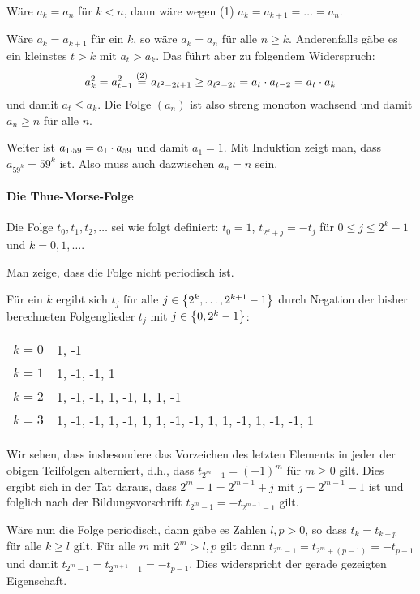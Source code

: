 \documentclass[11pt,a4paper]{article}
\begin{document}
\begin{loesung}
  Wäre $a_k=a_n$ für $k<n$, dann wäre wegen (1) $a_k=a_{k+1}=\dots=a_n$.

  Wäre $a_k=a_{k+1}$ für ein $k$, so wäre $a_k=a_n$ für alle $n\ge k$.
  Anderenfalls gäbe es ein kleinstes $t>k$ mit $a_t>a_k$. Das führt aber zu
  folgendem Widerspruch:
  \begin{gather*}
    a_k^2=a_{t-1}^2\stackrel{(2)}{=}a_{t^2-2t+1}\ge a_{t^2-2t}=a_t\cdot
    a_{t-2}=a_t\cdot a_k
  \end{gather*}
  und damit $a_t\le a_k$.  Die Folge $(a_n)$ ist also streng monoton
  wachsend und damit $a_n\ge n$ für alle $n$. 

  Weiter ist $a_{1\cdot 59}=a_1\cdot a_{59}$ und damit $a_1=1$. Mit Induktion zeigt
  man, dass $a_{59^k}=59^k$ ist. Also muss auch dazwischen $a_n=n$ sein.
\end{loesung}

\paragraph{Die Thue-Morse-Folge}
\begin{aufgabe}
  Die Folge $t_0,t_1,t_2,\dots$ sei wie folgt definiert: $t_0=1$,
  $t_{2^k+j}=-t_j$ für $0\le j\le 2^k-1$ und $k=0,1,\dots$.

  Man zeige, dass die Folge nicht periodisch ist.
\end{aufgabe}
\begin{loesung}
  Für ein $k$ ergibt sich $t_j$ für alle $j\in\left\{2^k,\dots,2^{k+1}-1\right\}$ durch
  Negation der bisher berechneten Folgenglieder $t_j$ mit $j\in\left\{0,2^k-1\right\}$:
  \begin{center}
    \begin{tabular}{c|l} 
      $k=0$ & 1, -1\\
      $k=1$ & 1, -1, -1, 1\\
      $k=2$ & 1, -1, -1, 1, -1, 1, 1, -1\\
      $k=3$ & 1, -1, -1, 1, -1, 1, 1, -1, -1, 1, 1, -1, 1, -1, -1, 1\\
    \end{tabular}  
  \end{center}

  Wir sehen, dass insbesondere das Vorzeichen des letzten Elements in jeder
  der obigen Teilfolgen alterniert, d.h., dass $t_{2^m-1}=(-1)^m$ für $m\ge 0$
  gilt.  Dies ergibt sich in der Tat daraus, dass $2^m-1=2^{m-1}+j$ mit
  $j=2^{m-1}-1$ ist und folglich nach der Bildungsvorschrift
  $t_{2^m-1}=-t_{2^{m-1}-1}$ gilt.

  Wäre nun die Folge periodisch, dann gäbe es Zahlen $l,p>0$, so dass
  $t_{k}=t_{k+p}$ für alle $k\ge l$ gilt.  Für alle $m$ mit $2^m>l,p$ gilt
  dann $t_{2^m-1}=t_{2^m+(p-1)}=-t_{p-1}$ und damit
  $t_{2^m-1}=t_{2^{m+1}-1}=-t_{p-1}$.  Dies widerspricht der gerade gezeigten
  Eigenschaft.
\end{loesung}
\end{document}
